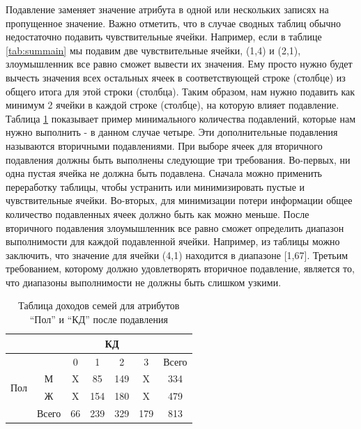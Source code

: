 Подавление заменяет значение атрибута в одной или нескольких записях на пропущенное значение. Важно отметить, что в случае сводных таблиц обычно недостаточно подавить чувствительные ячейки. Например, если в таблице \ref{tab:summain} мы подавим две чувствительные ячейки, (1,4) и (2,1), злоумышленник все равно сможет вывести их значения. Ему просто нужно будет вычесть значения всех остальных ячеек в соответствующей строке (столбце) из общего итога для этой строки (столбца). Таким образом, нам нужно подавить как минимум 2 ячейки в каждой строке (столбце), на которую влияет подавление. Таблица \ref{tab:suppression} показывает пример минимального количества подавлений, которые нам нужно выполнить - в данном случае четыре. Эти дополнительные подавления называются вторичными подавлениями. При выборе ячеек для вторичного подавления должны быть выполнены следующие три требования. Во-первых, ни одна пустая ячейка не должна быть подавлена. Сначала можно применить переработку таблицы, чтобы устранить или минимизировать пустые и чувствительные ячейки. Во-вторых, для минимизации потери информации общее количество подавленных ячеек должно быть как можно меньше. После вторичного подавления злоумышленник все равно сможет определить диапазон выполнимости для каждой подавленной ячейки. Например, из таблицы  можно заключить, что значение для ячейки (4,1) находится в диапазоне [1,67]. Третьим требованием, которому должно удовлетворять вторичное подавление, является то, что диапазоны выполнимости не должны быть слишком узкими.
\\

\begin{table}[h]
\centering
\begin{tabular}{|c|cccccc|}
\hline
                        & \multicolumn{6}{c|}{КД}                                                                                                         \\ \hline
\multirow{4}{*}{Пол} & \multicolumn{1}{c|}{}      & \multicolumn{1}{c|}{0}  & \multicolumn{1}{c|}{1}   & \multicolumn{1}{c|}{2}   & \multicolumn{1}{c|}{3}   & Всего \\ \cline{2-7} 
                        & \multicolumn{1}{c|}{М}     & \multicolumn{1}{c|}{X} & \multicolumn{1}{c|}{85}  & \multicolumn{1}{c|}{149} & \multicolumn{1}{c|}{X}  & 334   \\ \cline{2-7} 
                        & \multicolumn{1}{c|}{Ж}     & \multicolumn{1}{c|}{X} & \multicolumn{1}{c|}{154} & \multicolumn{1}{c|}{180} & \multicolumn{1}{c|}{X} & 479   \\ \cline{2-7} 
                        & \multicolumn{1}{c|}{Всего} & \multicolumn{1}{c|}{66} & \multicolumn{1}{c|}{239} & \multicolumn{1}{c|}{329} & \multicolumn{1}{c|}{179} & 813   \\ \hline
\end{tabular}
\caption{Таблица доходов семей для атрибутов \enquote{Пол} и \enquote{КД} после подавления}
\label{tab:suppression}
\end{table}

